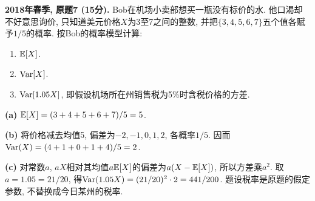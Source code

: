 \begin{exercise}\label{ex:m1-2018s-q7}
\textbf{2018年春季, 原题7 (15分).} Bob在机场小卖部想买一瓶没有标价的水. 他口渴却不好意思询价, 只知道美元价格$X$为3至7之间的整数, 并把$\{3,4,5,6,7\}$五个值各赋予$1/5$的概率. 按Bob的概率模型计算:
\begin{enumerate}\item[(a)]\label{ex:m1-2018s-q7-a} $\mathbb E[X]$.\item[(b)]\label{ex:m1-2018s-q7-b} $\operatorname{Var}[X]$.\item[(c)]\label{ex:m1-2018s-q7-c} $\operatorname{Var}[1.05X]$, 即假设机场所在州销售税为5\%时含税价格的方差.\end{enumerate}
\end{exercise}
\begin{solution}
\textbf{(a)}\label{sol:m1-2018s-q7-a} $\mathbb E[X]=(3+4+5+6+7)/5=5$.

\textbf{(b)}\label{sol:m1-2018s-q7-b} 将价格减去均值5, 偏差为$-2,-1,0,1,2$, 各概率$1/5$. 因而$\operatorname{Var}(X)=(4+1+0+1+4)/5=2$.

\textbf{(c)}\label{sol:m1-2018s-q7-c} 对常数$a$, $aX$相对其均值$a\mathbb E[X]$的偏差为$a(X-\mathbb E[X])$, 所以方差乘$a^2$. 取$a=1.05=21/20$, 得$\operatorname{Var}(1.05X)=(21/20)^2\cdot2=441/200$. 题设税率是原题的假定参数, 不替换成今日某州的税率.
\end{solution}

